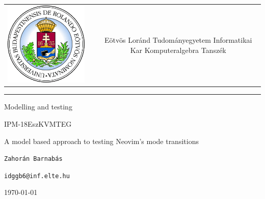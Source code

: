 \documentclass[12pt]{article}
\begin{document}

\begin{titlepage}
	\vspace*{0cm}
	\centering
	\begin{tabular}{cp{1cm}c}
		\begin{minipage}{4cm}
			\vspace{0pt}
			\includegraphics[width=1\textwidth]{images/elte_logo.png}
		\end{minipage} & &
		\begin{minipage}{7cm}
			\vspace{0pt}Eötvös Loránd Tudományegyetem \vspace{10pt} \newline
			Informatikai Kar \vspace{10pt} \newline
			Komputeralgebra Tanszék
		\end{minipage}
	\end{tabular}

	\vspace*{0.2cm}
	\rule{\textwidth}{1pt}

	\vspace*{3cm}
	{\Huge Modelling and testing}

	\vspace*{0.5cm}
	{\normalsize IPM-18EszKVMTEG}

	\vspace{2cm}
	{\huge A model based approach to testing Neovim's mode transitions}

	\vspace*{5cm}

	{\large \verb|Zahorán Barnabás| }

	{\large \verb|idggb6@inf.elte.hu| }

	\vfill

	\vspace*{1cm}
	\today
\end{titlepage}
\end{document}
